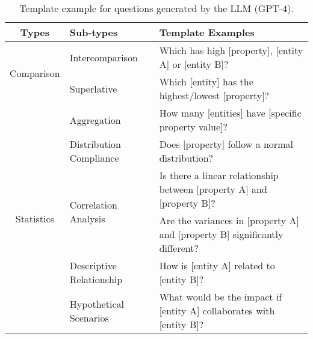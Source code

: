 \begin{table*}[ht]
\centering
\renewcommand\arraystretch{1}
\caption{Template example for questions generated by the LLM (GPT-4).}
\vspace{.2em}
\begin{tabular}{clp{7.5cm}}
\toprule
\textbf{Types} & \textbf{Sub-types} & \textbf{Template Examples}  \\
\midrule
\multirow{2}{*}{Comparison} 
    & \multirow{1}{*}{Intercomparison}   & Which has high [property], [entity A] or [entity B]?\\
    \cmidrule(lr){2-3}
    & \multirow{1}{*}{Superlative} & Which [entity] has the highest/lowest [property]?\\
\midrule
\multirow{6}{*}{Statistics} 
    &\multirow{1}{*}{Aggregation} & How many [entities] have [specific property value]?\\
    \cmidrule(lr){2-3} 
    &\multirow{1}{*}{Distribution Compliance} & Does [property] follow a normal distribution? \\
    \cmidrule(lr){2-3} 
    &\multirow{2}{*}{Correlation Analysis} & Is there a linear relationship between [property A] and [property B]?\\
    \cmidrule(lr){2-3} 
    &\multirow{2}{*}{Variance Analysis} & Are the variances in [property A] and [property B] significantly different?\\
\midrule
\multirow{3}{*}{Relationship} 
    & \multirow{1}{*}{Descriptive Relationship} & How is [entity A] related to [entity B]?\\
    \cmidrule(lr){2-3} 
    & \multirow{2}{*}{Hypothetical Scenarios} & What would be the impact if [entity A] collaborates with [entity B]?\\
\bottomrule
\end{tabular}
\label{tab:template}
\end{table*}

